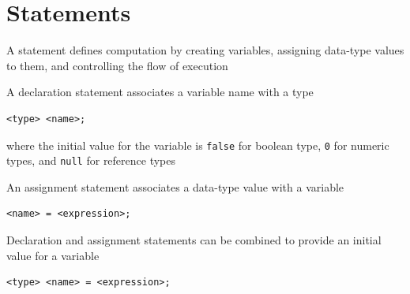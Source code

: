 \documentclass[8pt,a4paper,compress]{beamer}
\begin{document}
\section{Statements}
\begin{frame}[fragile]
\pause

A statement defines computation by creating variables, assigning data-type values to them, and controlling the flow of execution

\pause\bigskip

A declaration statement associates a variable name with a type

\smallskip

\begin{lstlisting}[language={},style=focusin]
<type> <name>;
\end{lstlisting}

\smallskip

where the initial value for the variable is \lstinline{false} for boolean type, \lstinline{0} for numeric types, and \lstinline{null} for reference types

\pause\bigskip

An assignment statement associates a data-type value with a variable

\smallskip

\begin{lstlisting}[language={},style=focusin]
<name> = <expression>;
\end{lstlisting}

\pause\bigskip

Declaration and assignment statements can be combined to provide an initial value for a variable

\smallskip

\begin{lstlisting}[language={},style=focusin]
<type> <name> = <expression>;
\end{lstlisting}
\end{frame}
\end{document}
